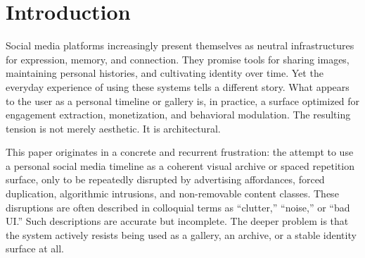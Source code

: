 \documentclass[11pt,oneside]{article}
\begin{document}
\begin{abstract}
Building on these foundations, the paper develops a formal apparatus for merge-aware systems. We define semantic objects, events, projections, reaction aggregation, and merge operations, and we specify explicit interface states—gallery, interaction, and annotation—with enforceable transition rules. Interaction affordances are treated as latent rather than persistent, appearing only after deliberate user action. Silence is reclassified as a valid and stable state rather than an error condition requiring remediation. These design commitments are shown to be architectural rather than stylistic: they determine whether systems conserve meaning or inevitably destroy it.

A formal appendix proves that semantic drift is unavoidable under minimal feed-based assumptions, independent of moderation quality or recommendation accuracy, while semantic accumulation is guaranteed under merge-aware constraints. The result is a structural theorem rather than an empirical claim: systems that bind reactions to instances rather than to semantic objects cannot preserve meaning over time.

The paper concludes that meaning cannot be optimized into existence through engagement metrics. It must be conserved by design. Gallery-first, merge-aware systems therefore represent not a refinement of existing social platforms, but a fundamentally different architectural regime—one aligned with human sense-making, durable identity, and the long-term preservation of meaning.
\end{abstract}

\section{Introduction}

Social media platforms increasingly present themselves as neutral infrastructures for expression, memory, and connection. They promise tools for sharing images, maintaining personal histories, and cultivating identity over time. Yet the everyday experience of using these systems tells a different story. What appears to the user as a personal timeline or gallery is, in practice, a surface optimized for engagement extraction, monetization, and behavioral modulation. The resulting tension is not merely aesthetic. It is architectural.

This paper originates in a concrete and recurrent frustration: the attempt to use a personal social media timeline as a coherent visual archive or spaced repetition surface, only to be repeatedly disrupted by advertising affordances, forced duplication, algorithmic intrusions, and non-removable content classes. These disruptions are often described in colloquial terms as “clutter,” “noise,” or “bad UI.” Such descriptions are accurate but incomplete. The deeper problem is that the system actively resists being used as a gallery, an archive, or a stable identity surface at all.
\end{document}
